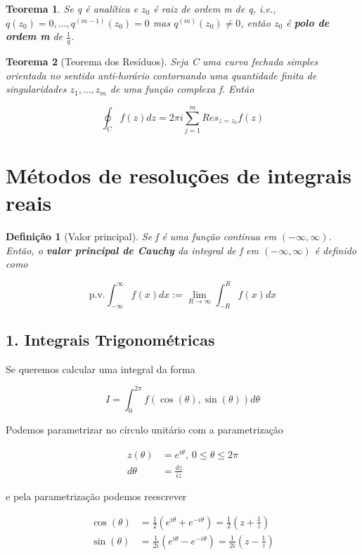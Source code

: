 \documentclass{article}
\newtheorem{theorem}{Teorema}
\newtheorem{definition}{Definição}
\begin{document}
\begin{theorem}
Se q é analítica e $z_0$ é raiz de ordem m de q, i.e., $q(z_0) = 0, \ldots, q^{(m - 1)}(z_0) = 0$ mas $q^{(m)}(z_0) \neq 0$, então $z_0$ é \textbf{polo de ordem m} de $\frac{1}{q}$.
\end{theorem}

\begin{theorem}[Teorema dos Resíduos]
Seja C uma curva fechada simples orientada no sentido anti-horário contornando uma quantidade finita de singularidades $z_1, \ldots, z_m$ de uma função complexa f. Então

$$\oint_C f(z) d z = 2 \pi i \sum_{j = 1}^m Res_{z = z_0} f(z)$$
\end{theorem}

\section*{Métodos de resoluções de integrais reais}
\label{s10}
\begin{definition}[Valor principal]
Se f é uma função continua em $(- \infty, \infty)$. Então, o \textbf{valor principal de Cauchy} da integral de f em $(- \infty, \infty)$ é definido como

$$\mathrm{p.v.} \int_{-\infty}^\infty f(x) d x := \lim_{R \to \infty} \int_{-R}^R f(x) d x$$
\end{definition}

\subsection*{1. Integrais Trigonométricas}
Se queremos calcular uma integral da forma

$$I = \int_0^{2\pi} f(\cos(\theta), \sin(\theta)) d \theta $$

Podemos parametrizar no círculo unitário com a parametrização

\begin{align*}
    z(\theta) &= e^{i \theta},\ 0 \leq \theta \leq 2 \pi \\
    d \theta &= \frac{d z}{i z}
\end{align*}

e pela parametrização podemos reescrever 

\begin{align*}
    \cos(\theta) &= \frac{1}{2} (e^{i \theta} + e^{ - i \theta}) = \frac{1}{2} \left(z + \frac{1}{z} \right) \\
    \sin(\theta) &= \frac{1}{2i} (e^{i \theta} - e^{ - i \theta}) = \frac{1}{2 i} \left(z - \frac{1}{z} \right)
\end{align*}
\end{document}
